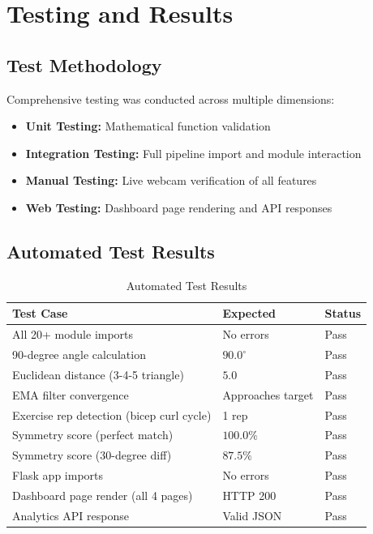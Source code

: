 \documentclass[a4paper,12pt]{report}
\begin{document}
\newpage

\chapter{Testing and Results}
\thispagestyle{contentpages}
\justifying

\section{Test Methodology}
Comprehensive testing was conducted across multiple dimensions:
\begin{itemize}
    \item \textbf{Unit Testing:} Mathematical function validation
    \item \textbf{Integration Testing:} Full pipeline import and module interaction
    \item \textbf{Manual Testing:} Live webcam verification of all features
    \item \textbf{Web Testing:} Dashboard page rendering and API responses
\end{itemize}

\section{Automated Test Results}

\begin{table}[H]
\centering
\begin{tabular}{|l|l|l|}
\hline
\textbf{Test Case} & \textbf{Expected} & \textbf{Status} \\
\hline
All 20+ module imports & No errors & Pass \\
90-degree angle calculation & $90.0^{\circ}$ & Pass \\
Euclidean distance (3-4-5 triangle) & $5.0$ & Pass \\
EMA filter convergence & Approaches target & Pass \\
Exercise rep detection (bicep curl cycle) & 1 rep & Pass \\
Symmetry score (perfect match) & $100.0\%$ & Pass \\
Symmetry score (30-degree diff) & $87.5\%$ & Pass \\
Flask app imports & No errors & Pass \\
Dashboard page render (all 4 pages) & HTTP 200 & Pass \\
Analytics API response & Valid JSON & Pass \\
\hline
\end{tabular}
\caption{Automated Test Results}
\label{tab:tests}
\end{table}
\end{document}
